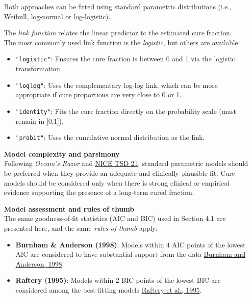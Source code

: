 \documentclass[
]{article}
\providecommand{\tightlist}{%
  \setlength{\itemsep}{0pt}\setlength{\parskip}{0pt}}
\begin{document}
Both approaches can be fitted using standard parametric distributions
(i.e., Weibull, log-normal or log-logistic).

The \emph{link function} relates the linear predictor to the estimated
cure fraction.\\
The most commonly used link function is the \emph{logistic}, but others
are available:

\begin{itemize}
\tightlist
\item
  \texttt{"logistic"}: Ensures the cure fraction is between 0 and 1 via
  the logistic transformation.\\
\item
  \texttt{"loglog"}: Uses the complementary log-log link, which can be
  more appropriate if cure proportions are very close to 0 or 1.\\
\item
  \texttt{"identity"}: Fits the cure fraction directly on the
  probability scale (must remain in {[}0,1{]}).\\
\item
  \texttt{"probit"}: Uses the cumulative normal distribution as the
  link.
\end{itemize}

\textbf{Model complexity and parsimony}\\
Following \emph{Occam's Razor} and
\href{https://www.sheffield.ac.uk/media/34188/download?attachment}{NICE
TSD 21}, standard parametric models should be preferred when they
provide an adequate and clinically plausible fit. Cure models should be
considered only when there is strong clinical or empirical evidence
supporting the presence of a long-term cured fraction.

\textbf{Model assessment and rules of thumb}\\
The same goodness-of-fit statistics (AIC and BIC) used in Section 4.1
are presented here, and the same \emph{rules of thumb} apply:

\begin{itemize}
\tightlist
\item
  \textbf{Burnham \& Anderson (1998)}: Models within 4 AIC points of the
  lowest AIC are considered to have substantial support from the data
  \href{https://doi.org/10.1007/978-1-4757-2917-7}{Burnham and Anderson,
  1998}.\\
\item
  \textbf{Raftery (1995)}: Models within 2 BIC points of the lowest BIC
  are considered among the best-fitting models
  \href{https://doi.org/10.2307/271063}{Raftery et al., 1995}.
\end{itemize}
\end{document}

